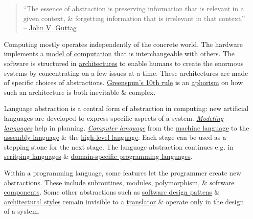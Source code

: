 \documentclass{article}
\begin{document}
\begin{quote}
	``The essence of abstraction is preserving information that is relevant in a given context, \& forgetting information that is irrelevant in that context.'' -- \href{https://en.wikipedia.org/wiki/John_Guttag}{\sc John V. Guttag}
\end{quote}
Computing mostly operates independently of the concrete world. The hardware implements a \href{https://en.wikipedia.org/wiki/Model_of_computation}{model of computation} that is interchangeable with others. The software is structured in \href{https://en.wikipedia.org/wiki/Software_architecture}{architectures} to enable humans to create the enormous systems by concentrating on a few issues at a time. These architectures are made of specific choices of abstractions. \href{https://en.wikipedia.org/wiki/Greenspun%27s_tenth_rule}{Greenspun's 10th rule} is an \href{https://en.wikipedia.org/wiki/Aphorism}{aphorism} on how such an architecture is both inevitable \& complex.

Language abstraction is a central form of abstraction in computing: new artificial languages are developed to express specific aspects of a system. \href{https://en.wikipedia.org/wiki/Modeling_languages}{\it Modeling languages} help in planning. \href{https://en.wikipedia.org/wiki/Computer_language}{\it Computer language} from the \href{https://en.wikipedia.org/wiki/First-generation_programming_language}{machine language} to the \href{https://en.wikipedia.org/wiki/Second-generation_programming_language}{assembly language} \& the \href{https://en.wikipedia.org/wiki/Third-generation_programming_language}{high-level language}. Each stage can be used as a stepping stone for the next stage. The language abstraction continues e.g. in \href{https://en.wikipedia.org/wiki/Scripting_language}{scritping languages} \& \href{https://en.wikipedia.org/wiki/Domain-specific_programming_language}{domain-specific programming languages}.

Within a programming language, some features let the programmer create new abstractions. These include \href{https://en.wikipedia.org/wiki/Subroutine}{subroutines}, \href{https://en.wikipedia.org/wiki/Module_(programming)}{modules}, \href{https://en.wikipedia.org/wiki/Polymorphism_(computer_science)}{polymorphism}, \& \href{https://en.wikipedia.org/wiki/Software_component}{software components}. Some other abstractions such as \href{https://en.wikipedia.org/wiki/Software_design_pattern}{software design pattens} \& \href{https://en.wikipedia.org/wiki/Software_architecture#Architectural_styles_and_patterns}{architectural styles} remain invisible to a \href{https://en.wikipedia.org/wiki/Translator_(computing)}{translator} \& operate only in the design of a system.
\end{document}
